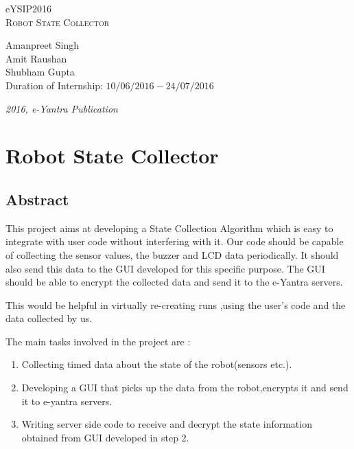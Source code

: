 \documentclass[a4paper,12pt,oneside]{book}
\begin{document}
\begin{titlepage}
\raggedright
{\Large eYSIP2016\\[1cm]}
{\Huge\scshape Robot State Collector\\[.1in]}
\vfill
\begin{flushright}
{\large Amanpreet Singh \\}
{\large Amit Raushan \\}
{\large Shubham Gupta \\}
{\large Duration of Internship: $ 10/06/2016-24/07/2016 $ \\}
\end{flushright}

{\itshape 2016, e-Yantra Publication}

\end{titlepage}

\tableofcontents


\chapter[Robot State Collector]{Robot State Collector}
\section{Abstract}

\hspace{5mm}This project aims at developing a State Collection Algorithm which is easy to integrate with user code without interfering with it. Our code should be capable of collecting the sensor values, the buzzer and LCD data periodically. It should also send this data to the GUI developed for this specific purpose. The GUI should be able to encrypt the collected data and send it to the e-Yantra servers.

This would be helpful in virtually re-creating runs ,using the user's code and the data collected by us.

The main tasks involved in the project are :

\begin{enumerate}

    \item Collecting timed data about the state of the robot(sensors etc.).
    \item Developing a GUI that picks up the data from the robot,encrypts it and send it to e-yantra servers.
    \item Writing server side code to receive and decrypt the state information obtained from GUI developed in step 2.

\end{enumerate}
\newpage
\end{document}
